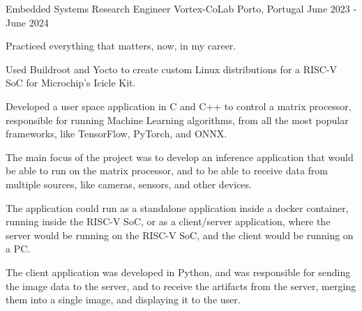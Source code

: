 

\begin{cventries}

  \cventry
    {Embedded Systems Research Engineer} %
    {Vortex-CoLab} %
    {Porto, Portugal} %
    {June 2023 - June 2024} %
    {
      \begin{cvitems} %
        \item {Practiced everything that matters, now, in my career.}
        \item {Used Buildroot and Yocto to create custom Linux distributions for a RISC-V SoC for Microchip's Icicle Kit.}
        \item {Developed a user space application in C and C++ to control a matrix processor, responsible for running Machine Learning algorithms, from all the most popular frameworks, like TensorFlow, PyTorch, and ONNX.}
        \item {The main focus of the project was to develop an inference application that would be able to run on the matrix processor, and to be able to receive data from multiple sources, like cameras, sensors, and other devices.}
        \item {The application could run as a standalone application inside a docker container, running inside the RISC-V SoC, or as a client/server application, where the server would be running on the RISC-V SoC, and the client would be running on a PC.}
        \item {The client application was developed in Python, and was responsible for sending the image data to the server, and to receive the artifacts from the server, merging them into a single image, and displaying it to the user.}
      \end{cvitems}
    }


\end{cventries}
